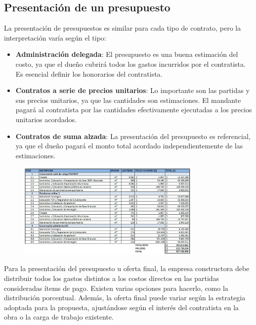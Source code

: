\subsection{Presentación de un presupuesto}

La presentación de presupuestos es similar para cada tipo de contrato, pero la interpretación varía según el tipo:

\begin{itemize}
    \item \textbf{Administración delegada}: El presupuesto es una buena estimación del costo, ya que el dueño cubrirá todos los gastos incurridos por el contratista. Es esencial definir los honorarios del contratista.
    
    \item \textbf{Contratos a serie de precios unitarios}: Lo importante son las partidas y sus precios unitarios, ya que las cantidades son estimaciones. El mandante pagará al contratista por las cantidades efectivamente ejecutadas a los precios unitarios acordados.
    
    \item \textbf{Contratos de suma alzada}: La presentación del presupuesto es referencial, ya que el dueño pagará el monto total acordado independientemente de las estimaciones.
\end{itemize}

\begin{figure}[H]
    \centering
    \includegraphics[width=0.8\textwidth]{FOTOS/ej_pu.png}
    \label{fig:presupuesto}
\end{figure}

Para la presentación del presupuesto u oferta final, la empresa constructora debe distribuir todos los gastos distintos a los costos directos en las partidas consideradas ítems de pago. Existen varias opciones para hacerlo, como la distribución porcentual. Además, la oferta final puede variar según la estrategia adoptada para la propuesta, ajustándose según el interés del contratista en la obra o la carga de trabajo existente.

